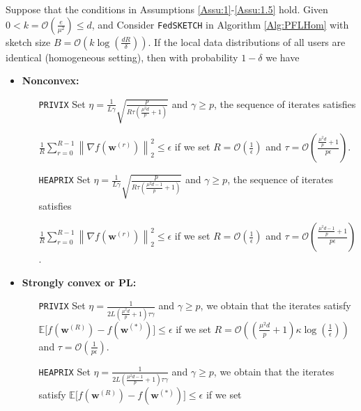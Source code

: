 \documentclass[review,onefignum,onetabnum]{siamart190516}
\begin{document}
\begin{theorem}\label{thm:homog_case}
  Suppose that the conditions in Assumptions \ref{Assu:1}-\ref{Assu:1.5} hold. Given $0<k=\mathcal{O}\left(\frac{e}{\mu^2}\right)\leq d$, and Consider \texttt{FedSKETCH} in Algorithm \ref{Alg:PFLHom} with sketch size $B=\mathcal{O}\left(k\log\left(\frac{d R}{\delta}\right)\right)$. If the local data distributions of all users are identical (homogeneous setting), then with probability $1-\delta$ we have  
 \begin{itemize}
     \item \textbf{Nonconvex:}  
     \begin{itemize}
         \item [\texttt{PRIVIX}] Set $\eta=\frac{1}{L\gamma}\sqrt{\frac{p}{R\tau\left(\frac{\mu^2d}{p}+1\right)}}$ and $\gamma\geq p$, the sequence of iterates satisfies 
         
          $\frac{1}{R}\sum_{r=0}^{R-1}\left\|\nabla f({\boldsymbol{w}}^{(r)})\right\|_2^2\leq {\epsilon}$ if we set
     $R=\mathcal{O}\left(\frac{1}{\epsilon}\right)$ and $ \tau=\mathcal{O}\left(\frac{\frac{\mu^2d}{p}+1}{{p}\epsilon}\right)$.
         \item [\texttt{HEAPRIX}] Set 
$\eta=\frac{1}{L\gamma}\sqrt{\frac{p}{R\tau\left(\frac{\mu^2d-1}{p}+1\right)}}$ and $\gamma\geq p$, the sequence of iterates satisfies  

$\frac{1}{R}\sum_{r=0}^{R-1}\left\|\nabla f({\boldsymbol{w}}^{(r)})\right\|_2^2\leq {\epsilon}$ if we set
     $R=\mathcal{O}\left(\frac{1}{\epsilon}\right)$ and $ \tau=\mathcal{O}\left(\frac{\frac{\mu^2d-1}{p}+1}{{p}\epsilon}\right)$. 
     \end{itemize}
     
     \item \textbf{Strongly convex or PL:}
      \begin{itemize}
         \item [\texttt{PRIVIX}] Set $\eta=\frac{1}{2L\left(\frac{\mu^2d}{p}+1\right)\tau\gamma}$ and $\gamma\geq p$, we obtain that the iterates satisfy $\mathbb{E}\Big[f({\boldsymbol{w}}^{(R)})-f({\boldsymbol{w}}^{(*)})\Big]\leq \epsilon$ if  we set
     $R=\mathcal{O}\left(\left(\frac{\mu^2d}{p}+1\right)\kappa\log\left(\frac{1}{\epsilon}\right)\right)$ and $ \tau=\mathcal{O}\left(\frac{1}{p\epsilon}\right)$.
          
         \item [\texttt{HEAPRIX}] Set $\eta=\frac{1}{2L\left(\frac{\mu^2d-1}{p}+1\right)\tau\gamma}$ and $\gamma\geq p$, we obtain that the iterates satisfy $\mathbb{E}\Big[f({\boldsymbol{w}}^{(R)})-f({\boldsymbol{w}}^{(*)})\Big]\leq \epsilon$ if  we set


\end{itemize}
\end{itemize}
\end{theorem}
\end{document}
